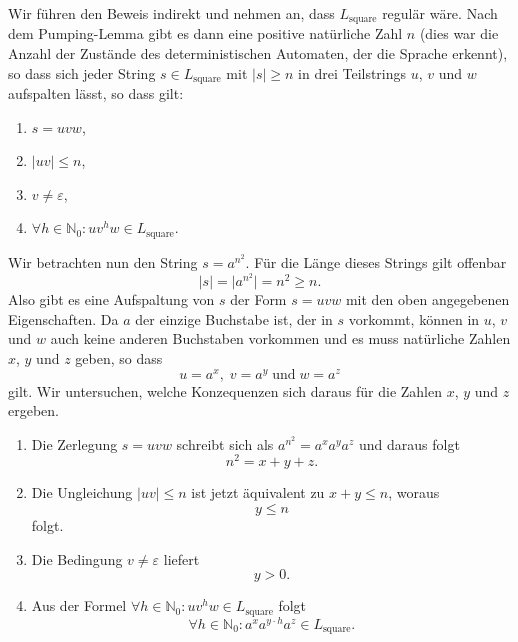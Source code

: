 \solution
Wir f\"uhren den Beweis indirekt und nehmen an, dass $L_{\mathrm{square}}$ regul\"ar
w\"are.  Nach dem Pumping-Lemma gibt es dann eine positive nat\"urliche Zahl $n$ (dies war die Anzahl
der Zust\"ande des deterministischen Automaten, der die Sprache erkennt), so dass sich jeder String
$s \in L_{\mathrm{square}}$ mit $|s| \geq n$ in drei Teilstrings $u$, $v$ und $w$ aufspalten l\"asst, so dass gilt:
\begin{enumerate}
\item $s = uvw$,
\item $|uv| \leq n$,
\item $v \not= \varepsilon$,
\item $\forall h \in \mathbb{N}_0: uv^hw \in L_{\mathrm{square}}$. 
\end{enumerate} 
Wir betrachten nun den String $s = a^{n^2}$.  F\"ur die L\"ange dieses Strings gilt offenbar
\[ |s| = \big| a^{n^2} \big| = n^2 \geq n. \]
Also gibt es eine Aufspaltung von $s$ der Form $s = uvw$ mit den oben angegebenen Eigenschaften.
Da $a$ der einzige Buchstabe ist, der in $s$ vorkommt, k\"onnen in $u$, $v$ und $w$ auch keine anderen
Buchstaben vorkommen und es muss nat\"urliche Zahlen $x$, $y$ und $z$ geben, so dass 
\[ u = a^x,\; v = a^y\; \mbox{und}\; w = a^z \]
gilt.  Wir untersuchen, welche Konzequenzen sich daraus f\"ur die Zahlen $x$, $y$ und $z$ ergeben.
\begin{enumerate}
\item Die Zerlegung $s = uvw$ schreibt sich als $a^{n^2} = a^xa^ya^z$ und daraus folgt
      \begin{equation}
        \label{eq:e1}
         n^2 = x + y + z.     
      \end{equation}
\item Die Ungleichung $|uv| \leq n$ ist jetzt \"aquivalent zu $x +y \leq n$, woraus 
      \begin{equation}
        \label{eq:e2}
        y \leq n
      \end{equation}
      folgt.
\item Die Bedingung $v \not= \varepsilon$ liefert
      \begin{equation}
        \label{eq:e3}
        y > 0.
      \end{equation}
\item Aus der Formel $\forall h \in \mathbb{N}_0: uv^hw \in L_{\mathrm{square}}$ folgt
      \begin{equation}
        \label{eq:e4}
        \forall h \in \mathbb{N}_0: a^xa^{y\cdot h}a^z \in L_{\mathrm{square}}. 
      \end{equation}
\end{enumerate}
